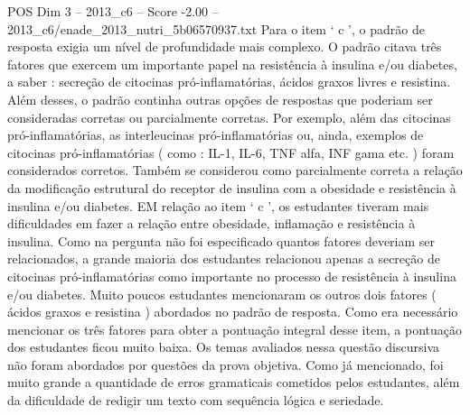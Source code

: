 \begin{textsample}{POS Dim 3 – 2013\_c6 – Score -2.00 – 2013\_c6/enade\_2013\_nutri\_5b06570937.txt}
Para o item ‘ c ’, o padrão de resposta exigia um nível de profundidade mais complexo.
O padrão citava três fatores que exercem um importante papel na resistência à insulina e/ou diabetes, a saber : secreção de citocinas pró-inflamatórias, ácidos graxos livres e resistina.
Além desses, o padrão continha outras opções de respostas que poderiam ser consideradas corretas ou parcialmente corretas.
Por exemplo, além das citocinas pró-inflamatórias, as interleucinas pró-inflamatórias ou, ainda, exemplos de citocinas pró-inflamatórias ( como : IL-1, IL-6, TNF alfa, INF gama etc. ) foram considerados corretos.
Também se considerou como parcialmente correta a relação da modificação estrutural do receptor de insulina com a obesidade e resistência à insulina e/ou diabetes.
EM relação ao item ‘ c ’, os estudantes tiveram mais dificuldades em fazer a relação entre obesidade, inflamação e resistência à insulina.
Como na pergunta não foi especificado quantos fatores deveriam ser relacionados, a grande maioria dos estudantes relacionou apenas a secreção de citocinas pró-inflamatórias como importante no processo de resistência à insulina e/ou diabetes.
Muito poucos estudantes mencionaram os outros dois fatores ( ácidos graxos e resistina ) abordados no padrão de resposta.
Como era necessário mencionar os três fatores para obter a pontuação integral desse item, a pontuação dos estudantes ficou muito baixa.
Os temas avaliados nessa questão discursiva não foram abordados por questões da prova objetiva.
Como já mencionado, foi muito grande a quantidade de erros gramaticais cometidos pelos estudantes, além da dificuldade de redigir um texto com sequência lógica e seriedade.

\end{textsample}
